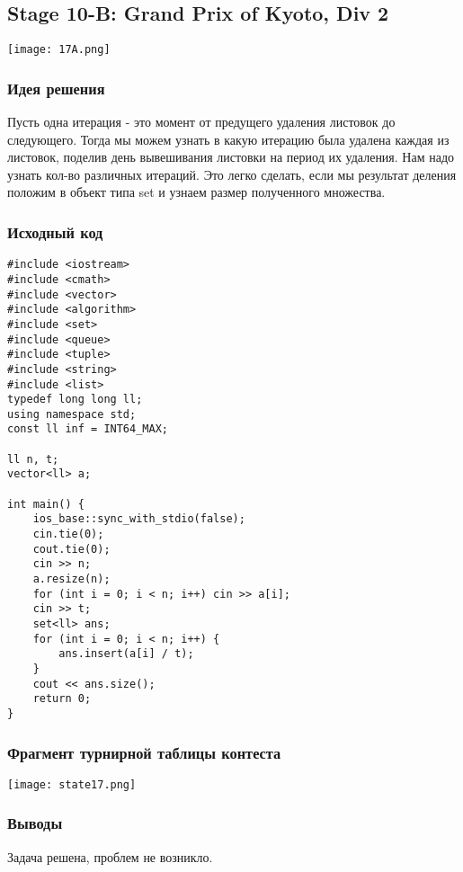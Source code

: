 \subsection*{Stage 10-B: Grand Prix of Kyoto, Div 2}
\begin{center}
\texttt{[image: 17A.png]}
\end{center}
\subsubsection*{Идея решения}
Пусть одна итерация - это момент от предущего удаления листовок до следующего. Тогда мы можем узнать в какую итерацию была удалена каждая из листовок, поделив день вывешивания листовки на период их удаления. Нам надо узнать кол-во различных итераций. Это легко сделать, если мы результат деления положим в объект типа set и узнаем размер полученного множества. 
\subsubsection*{Исходный код}
\begin{lstlisting}
#include <iostream>
#include <cmath>
#include <vector>
#include <algorithm>
#include <set>
#include <queue>
#include <tuple>
#include <string>
#include <list>
typedef long long ll;
using namespace std;
const ll inf = INT64_MAX;

ll n, t;
vector<ll> a;

int main() {
	ios_base::sync_with_stdio(false);
	cin.tie(0);
	cout.tie(0);
	cin >> n;
	a.resize(n);
	for (int i = 0; i < n; i++) cin >> a[i];
	cin >> t;
	set<ll> ans;
	for (int i = 0; i < n; i++) {
		ans.insert(a[i] / t);
	}
	cout << ans.size();
	return 0;
}
\end{lstlisting}
\subsubsection*{Фрагмент турнирной таблицы контеста}
\begin{center}
\texttt{[image: state17.png]}\newline\noindent
\end{center}

\subsubsection*{Выводы}
Задача решена, проблем не возникло. 
